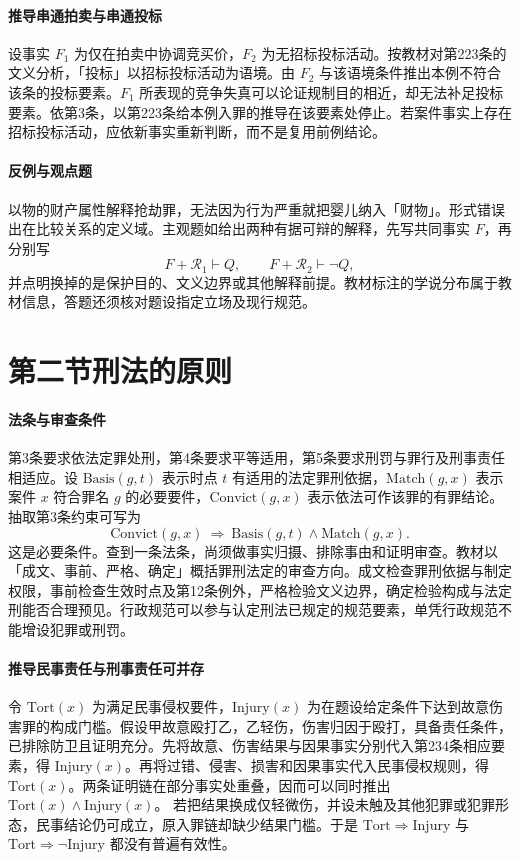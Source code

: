 \paragraph{推导\quad 串通拍卖与串通投标}
设事实 \(F_1\) 为仅在拍卖中协调竞买价，\(F_2\) 为无招标投标活动。按教材对第223条的文义分析，「投标」以招标投标活动为语境。由 \(F_2\) 与该语境条件推出本例不符合该条的投标要素。\(F_1\) 所表现的竞争失真可以论证规制目的相近，却无法补足投标要素。依第3条，以第223条给本例入罪的推导在该要素处停止。若案件事实上存在招标投标活动，应依新事实重新判断，而不是复用前例结论。

\paragraph{反例与观点题}
以物的财产属性解释抢劫罪，无法因为行为严重就把婴儿纳入「财物」。形式错误出在比较关系的定义域。主观题如给出两种有据可辩的解释，先写共同事实 \(F\)，再分别写
\[
  F+\mathcal R_1\vdash Q,\qquad F+\mathcal R_2\vdash\neg Q,
\]
并点明换掉的是保护目的、文义边界或其他解释前提。教材标注的学说分布属于教材信息，答题还须核对题设指定立场及现行规范。

\section{第二节\quad 刑法的原则}

\paragraph{法条与审查条件}
第3条要求依法定罪处刑，第4条要求平等适用，第5条要求刑罚与罪行及刑事责任相适应。设 \(\mathrm{Basis}(g,t)\) 表示时点 \(t\) 有适用的法定罪刑依据，\(\mathrm{Match}(g,x)\) 表示案件 \(x\) 符合罪名 \(g\) 的必要要件，\(\mathrm{Convict}(g,x)\) 表示依法可作该罪的有罪结论。抽取第3条约束可写为
\[
 \mathrm{Convict}(g,x)
 \ \Longrightarrow\ \mathrm{Basis}(g,t)\land\mathrm{Match}(g,x).
\]
这是必要条件。查到一条法条，尚须做事实归摄、排除事由和证明审查。教材以「成文、事前、严格、确定」概括罪刑法定的审查方向。成文检查罪刑依据与制定权限，事前检查生效时点及第12条例外，严格检验文义边界，确定检验构成与法定刑能否合理预见。行政规范可以参与认定刑法已规定的规范要素，单凭行政规范不能增设犯罪或刑罚。

\paragraph{推导\quad 民事责任与刑事责任可并存}
令 \(\mathrm{Tort}(x)\) 为满足民事侵权要件，\(\mathrm{Injury}(x)\) 为在题设给定条件下达到故意伤害罪的构成门槛。假设甲故意殴打乙，乙轻伤，伤害归因于殴打，具备责任条件，已排除防卫且证明充分。先将故意、伤害结果与因果事实分别代入第234条相应要素，得 \(\mathrm{Injury}(x)\)。再将过错、侵害、损害和因果事实代入民事侵权规则，得 \(\mathrm{Tort}(x)\)。两条证明链在部分事实处重叠，因而可以同时推出 \(\mathrm{Tort}(x)\land\mathrm{Injury}(x)\)。
若把结果换成仅轻微伤，并设未触及其他犯罪或犯罪形态，民事结论仍可成立，原入罪链却缺少结果门槛。于是 \(\mathrm{Tort}\Rightarrow\mathrm{Injury}\) 与 \(\mathrm{Tort}\Rightarrow\neg\mathrm{Injury}\) 都没有普遍有效性。

